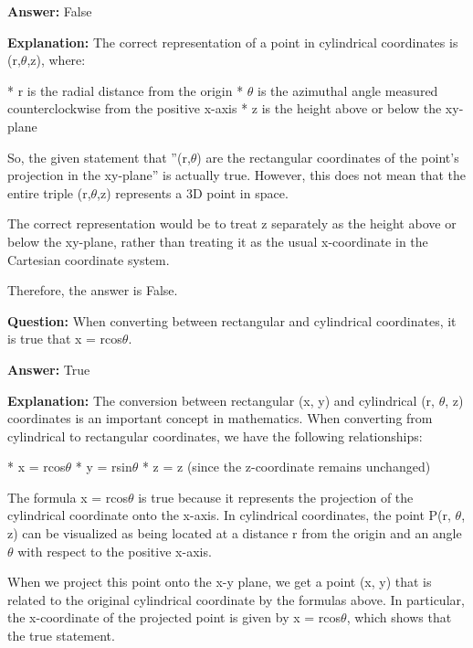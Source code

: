 \documentclass{article}
\begin{document}
                \textbf{Answer:} False

                \textbf{Explanation:} The correct representation of a point in cylindrical coordinates is (r,\ensuremath{\theta},z), where:

* r is the radial distance from the origin
* \ensuremath{\theta} is the azimuthal angle measured counterclockwise from the positive x-axis
* z is the height above or below the xy-plane

So, the given statement that ''(r,\ensuremath{\theta}) are the rectangular coordinates of the point's projection in the xy-plane'' is actually true. However, this does not mean that the entire triple (r,\ensuremath{\theta},z) represents a 3D point in space.

The correct representation would be to treat z separately as the height above or below the xy-plane, rather than treating it as the usual x-coordinate in the Cartesian coordinate system.

Therefore, the answer is False.
                
                \vspace{0.5cm} 
        
            
                \textbf {Question:} When converting between rectangular and cylindrical coordinates, it is true that x = rcos\ensuremath{\theta}.
                
                \textbf{Answer:} True

                \textbf{Explanation:} The conversion between rectangular (x, y) and cylindrical (r, \ensuremath{\theta}, z) coordinates is an important concept in mathematics. When converting from cylindrical to rectangular coordinates, we have the following relationships:

* x = rcos\ensuremath{\theta}
* y = rsin\ensuremath{\theta}
* z = z (since the z-coordinate remains unchanged)

The formula x = rcos\ensuremath{\theta} is true because it represents the projection of the cylindrical coordinate onto the x-axis. In cylindrical coordinates, the point P(r, \ensuremath{\theta}, z) can be visualized as being located at a distance r from the origin and an angle \ensuremath{\theta} with respect to the positive x-axis.

When we project this point onto the x-y plane, we get a point (x, y) that is related to the original cylindrical coordinate by the formulas above. In particular, the x-coordinate of the projected point is given by x = rcos\ensuremath{\theta}, which shows that the true statement.
                
\end{document}
